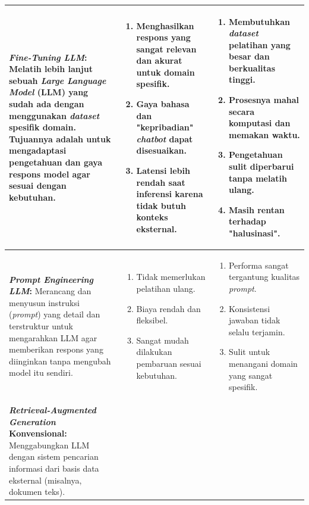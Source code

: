 \begin{longtable}{|p{4cm}|p{5cm}|p{5cm}|}
	\textbf{\textit{Fine-Tuning LLM}: }
	Melatih lebih lanjut sebuah \textit{Large Language Model} (LLM) yang sudah ada dengan menggunakan \textit{dataset} spesifik domain.
	Tujuannya adalah untuk mengadaptasi pengetahuan dan gaya respons model agar sesuai dengan kebutuhan.
	                &
	\begin{enumerate}
		\item Menghasilkan respons yang sangat relevan dan akurat untuk domain spesifik.
		\item Gaya bahasa dan "kepribadian" \textit{chatbot} dapat disesuaikan.
		\item Latensi lebih rendah saat inferensi karena tidak butuh konteks eksternal.
	\end{enumerate}
	                &
	\begin{enumerate}
		\item Membutuhkan \textit{dataset} pelatihan yang besar dan berkualitas tinggi.
		\item Prosesnya mahal secara komputasi dan memakan waktu.
		\item Pengetahuan sulit diperbarui tanpa melatih ulang.
		\item Masih rentan terhadap "halusinasi".
	\end{enumerate}
	\\
	\hline
	\textbf{\textit{Prompt Engineering LLM}: }
	Merancang dan menyusun instruksi (\textit{prompt}) yang detail dan terstruktur untuk mengarahkan LLM agar memberikan respons yang diinginkan tanpa mengubah model itu sendiri.
	                &
	\begin{enumerate}
		\item Tidak memerlukan pelatihan ulang.
		\item Biaya rendah dan fleksibel.
		\item Sangat mudah dilakukan pembaruan sesuai kebutuhan.
	\end{enumerate}
	                &
	\begin{enumerate}
		\item Performa sangat tergantung kualitas \textit{prompt}.
		\item Konsistensi jawaban tidak selalu terjamin.
		\item Sulit untuk menangani domain yang sangat spesifik.
	\end{enumerate}
	\\
	\hline
	\textbf{\textit{Retrieval-Augmented Generation} Konvensional: }
	Menggabungkan LLM dengan sistem pencarian informasi dari basis data eksternal (misalnya, dokumen teks).

\end{longtable}
